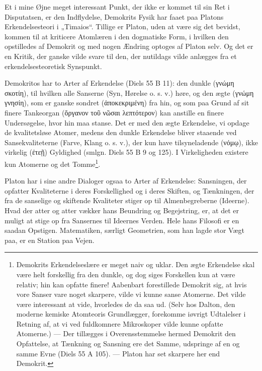 \documentclass[12pt,a4paper,openany]{book}
\newcommand{\opage}[1]{\marginnote{\footnotesize\textit{[#1]}}}
\begin{document}
\setcounter{footnote}{0}%
\opage{98}Et i mine Øjne meget interessant Punkt, der ikke er kommet
til sin Ret i Disputatsen, er den Indflydelse, Demokrits
Fysik har faaet paa Platons Erkendelsesteori i „Timaios“. Tillige
er Platon, uden at være sig det bevidst, kommen til at
kriticere Atomlæren i den dogmatiske Form, i hvilken den opstilledes
af Demokrit og med nogen Ændring optoges af Platon
selv. Og det er en Kritik, der ganske vilde svare til den, der
nutildags vilde anlægges fra et erkendelsesteoretisk Synspunkt.

Demokritos har to Arter af Erkendelse (Diels 55 B 11):
den dunkle (γνώμη σκοτίη), til hvilken alle Sanserne (Syn, Hørelse
o. s. v.) høre, og den ægte (γνώμη γνησίη), som er ganske
sondret (ἀποκεκριμένη) fra hin, og som paa Grund af sit finere
Tankeorgan (ὄργανον τοῦ νῶσαι λεπτότερον) kan anstille en
finere Undersøgelse, hvor hin maa stanse. Det er med den
ægte Erkendelse, vi opdage de kvalitetsløse Atomer, medens
den dunkle Erkendelse bliver staaende ved Sansekvaliteterne
(Farve, Klang o. s. v.), der kun have tilsyneladende (νόμῳ),
ikke virkelig (ἐτεῇ) Gyldighed (smlgn. Diels 55 B 9 og 125).
I Virkeligheden existere kun Atomerne og det Tomme\footnote[1]{Demokrits Erkendelseslære er meget naiv og uklar. Den ægte Erkendelse skal være helt forskellig fra den dunkle, og dog siges Forskellen kun at være relativ; hin kan opfatte finere! Aabenbart forestillede Demokrit sig, at hvis vore Sanser vare noget skarpere, vilde vi kunne sanse Atomerne. Det vilde være interessant at vide, hvorledes de da saa ud. (Selv hos Dalton, den moderne kemiske Atomteoris Grundlægger, forekomme iøvrigt Udtalelser i Retning af, at vi ved fuldkomnere Mikroskoper vilde kunne opfatte Atomerne.) --- Der tillægges i Overensstemmelse hermed Demokrit den Opfattelse, at Tænkning og Sansning ere det Samme, udspringe af en og samme Evne (Diels 55 A 105). --- Platon har set skarpere her end Demokrit.}.

Platon har i sine andre Dialoger ogsaa to Arter af Erkendelse:
Sansningen, der opfatter Kvaliteterne i deres Forskellighed
og i deres Skiften, og Tænkningen, der fra de sanselige
og skiftende Kvaliteter stiger op til Almenbegreberne (Ideerne).
Hvad der atter og atter vækker hans Beundring og Begejstring,
er, at det er muligt at stige op fra Sansernes til Ideernes Verden.
Hele hans Filosofi er en saadan Opstigen. Matematiken,
\setcounter{footnote}{0}%
\opage{99}særligt Geometrien, som han lagde stor Vægt paa, er en Station
paa Vejen.
\end{document}

